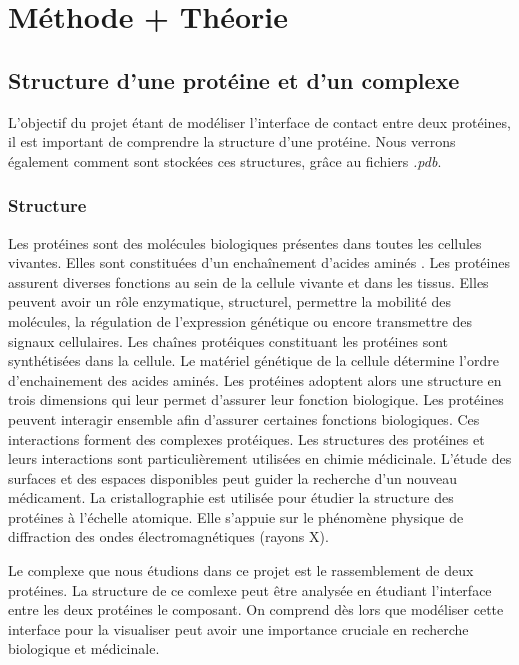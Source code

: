 \chapter{Méthode + Théorie}

\section{Structure d'une protéine et d'un complexe}

L'objectif du projet étant de modéliser l'interface de contact entre deux protéines,
il est important de comprendre la structure d'une protéine. Nous verrons également
comment sont stockées ces structures, grâce au fichiers \textit{.pdb}.

\subsection*{Structure}

Les protéines sont des molécules biologiques présentes dans toutes les cellules vivantes.
Elles sont constituées d'un enchaînement d'acides aminés \cite{Prot}.
Les protéines assurent diverses fonctions au sein de la cellule vivante et dans les tissus.
Elles peuvent avoir un rôle enzymatique, structurel, permettre la mobilité des molécules, la
régulation de l'expression génétique ou encore transmettre des signaux cellulaires.
Les chaînes protéiques constituant les protéines sont synthétisées dans la cellule. Le
matériel génétique de la cellule détermine l'ordre d'enchainement des acides aminés.
Les protéines adoptent alors une structure en trois dimensions qui leur permet d'assurer
 leur fonction biologique. Les protéines peuvent interagir ensemble afin d'assurer certaines
fonctions biologiques. Ces interactions forment des complexes protéiques. Les structures
 des protéines et leurs interactions sont particulièrement utilisées en chimie médicinale.
L'étude des surfaces et des espaces disponibles peut guider la recherche d'un nouveau
médicament. La cristallographie est utilisée pour étudier la structure des protéines à
l'échelle atomique. Elle s'appuie sur le phénomène physique de diffraction des ondes
électromagnétiques (rayons X).

Le complexe que nous étudions dans ce projet est le rassemblement de
deux protéines. La structure de ce comlexe peut être analysée en étudiant l'interface
entre les deux protéines le composant. On comprend dès lors que modéliser cette interface
pour la visualiser peut avoir une importance cruciale en recherche biologique et médicinale.

